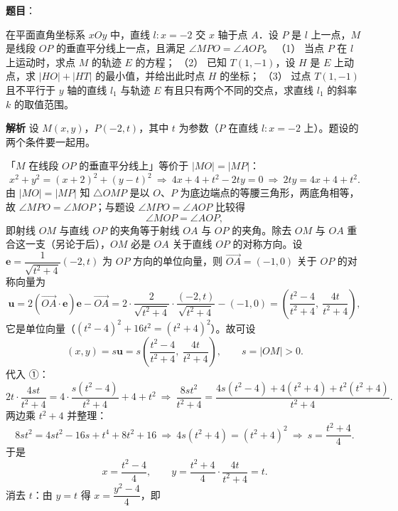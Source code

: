 \begin{answer}

\textbf{题目}：

在平面直角坐标系 $xOy$ 中，直线 $l:x=-2$ 交 $x$ 轴于点 $A$．设 $P$ 是 $l$ 上一点，$M$ 是线段 $OP$ 的垂直平分线上一点，且满足 $\angle MPO=\angle AOP$。
（1） 当点 $P$ 在 $l$ 上运动时，求点 $M$ 的轨迹 $E$ 的方程；
（2） 已知 $T(1,-1)$，设 $H$ 是 $E$ 上动点，求 $|HO|+|HT|$ 的最小值，并给出此时点 $H$ 的坐标；
（3） 过点 $T(1,-1)$ 且不平行于 $y$ 轴的直线 $l_1$ 与轨迹 $E$ 有且只有两个不同的交点，求直线 $l_1$ 的斜率 $k$ 的取值范围。

\textbf{解析}
设 $M(x,y)$，$P(-2,t)$，其中 $t$ 为参数（$P$ 在直线 $l:x=-2$ 上）。题设的两个条件要一起用。

「$M$ 在线段 $OP$ 的垂直平分线上」等价于 $|MO|=|MP|$：
\nopagebreak[4]
\[
x^2+y^2=(x+2)^2+(y-t)^2\ \Longrightarrow\ 4x+4+t^2-2ty=0\ \Longrightarrow\ 2ty=4x+4+t^2.\tag{①}
\]
由 $|MO|=|MP|$ 知 $\triangle OMP$ 是以 $O$、$P$ 为底边端点的等腰三角形，两底角相等，故 $\angle MPO=\angle MOP$；与题设 $\angle MPO=\angle AOP$ 比较得
\nopagebreak[4]
\[
\angle MOP=\angle AOP,
\]
即射线 $OM$ 与直线 $OP$ 的夹角等于射线 $OA$ 与 $OP$ 的夹角。除去 $OM$ 与 $OA$ 重合这一支（另论于后），$OM$ 必是 $OA$ 关于直线 $OP$ 的对称方向。设 $\boldsymbol e=\dfrac{1}{\sqrt{t^2+4}}(-2,t)$ 为 $OP$ 方向的单位向量，则 $\overrightarrow{OA}=(-1,0)$ 关于 $OP$ 的对称向量为
\nopagebreak[4]
\[
\boldsymbol u=2\left(\overrightarrow{OA}\cdot\boldsymbol e\right)\boldsymbol e-\overrightarrow{OA}
=2\cdot\frac{2}{\sqrt{t^2+4}}\cdot\frac{(-2,t)}{\sqrt{t^2+4}}-(-1,0)
=\left(\frac{t^2-4}{t^2+4},\ \frac{4t}{t^2+4}\right),
\]
它是单位向量（$(t^2-4)^2+16t^2=(t^2+4)^2$）。故可设
\nopagebreak[4]
\[
(x,y)=s\boldsymbol u=s\left(\frac{t^2-4}{t^2+4},\ \frac{4t}{t^2+4}\right),\qquad s=|OM|>0.
\]
代入 ①：
\nopagebreak[4]
\[
2t\cdot\frac{4st}{t^2+4}=4\cdot\frac{s(t^2-4)}{t^2+4}+4+t^2
\ \Longrightarrow\ \frac{8st^2}{t^2+4}=\frac{4s(t^2-4)+4(t^2+4)+t^2(t^2+4)}{t^2+4}.
\]
两边乘 $t^2+4$ 并整理：
\nopagebreak[4]
\[
8st^2=4st^2-16s+t^4+8t^2+16\ \Longrightarrow\ 4s\left(t^2+4\right)=\left(t^2+4\right)^2\ \Longrightarrow\ s=\frac{t^2+4}{4}.
\]
于是
\nopagebreak[4]
\[
x=\frac{t^2-4}{4},\qquad y=\frac{t^2+4}{4}\cdot\frac{4t}{t^2+4}=t.
\]
消去 $t$：由 $y=t$ 得 $x=\dfrac{y^2-4}{4}$，即
\nopagebreak[4]
\[
\]
\end{answer}
